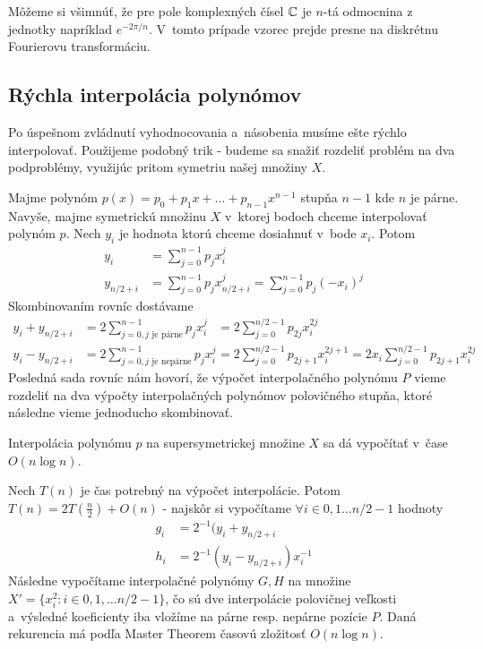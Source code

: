 \begin{poznamka}
    Môžeme si všimnúť, že pre pole komplexných čísel $\mathbb{C}$ je $n$-tá
    odmocnina z jednotky napríklad $e^{-2\pi/n}$. V~tomto prípade
    vzorec \todo{} prejde presne na diskrétnu Fourierovu
    transformáciu.
\end{poznamka}

\subsection{Rýchla interpolácia polynómov}
Po úspešnom zvládnutí vyhodnocovania a~násobenia musíme ešte rýchlo
interpolovať. Použijeme podobný trik - budeme sa snažiť rozdeliť
problém na dva podproblémy, využijúc pritom symetriu našej množiny $X$.

Majme polynóm $p(x)=p_0 + p_1 x + \dots + p_{n-1} x^{n-1}$ stupňa
$n-1$ kde $n$ je párne. Navyše, majme symetrickú množinu $X$ v~ktorej
bodoch chceme interpolovať polynóm $p$. 
Nech $y_i$ je hodnota ktorú chceme dosiahnuť v~bode $x_i$. Potom
\begin{align*}
    y_i &= \sum_{j=0}^{n-1} p_j x_i^j \\
    y_{n/2+i} &= \sum_{j=0}^{n-1} p_j x_{n/2+i}^j 
            = \sum_{j=0}^{n-1} p_j (-x_i)^j 
\end{align*}
Skombinovaním rovníc dostávame
\begin{align*}
    y_i + y_{n/2 + i} &= 2 \sum_{j=0, j\text{ je párne}}^{n-1} p_j x_i^j
     &= 2 \sum_{j=0}^{n/2-1} p_{2j} x_i^{2j} \\
    y_i - y_{n/2 + i} &= 2 \sum_{j=0, j\text{ je nepárne}}^{n-1} p_j x_i^j
     &= 2 \sum_{j=0}^{n/2-1} p_{2j+1} x_i^{2j+1} =
      2 x_i \sum_{j=0}^{n/2-1} p_{2j+1} x_i^{2j}
\end{align*}
Posledná sada rovníc nám hovorí, že výpočet interpolačného polynómu
$P$ vieme rozdeliť na dva výpočty interpolačných polynómov polovičného
stupňa, ktoré následne vieme jednoducho skombinovať.
\begin{lema}
    Interpolácia polynómu $p$ na supersymetrickej množine $X$ sa dá
    vypočítať v~čase $O(n \log n)$.
\end{lema}
\begin{dokaz}
    Nech $T(n)$ je čas potrebný na výpočet interpolácie.
    Potom $T(n)=2 T(\frac{n}{2}) + O(n)$ - najskôr si vypočítame
    $\forall i \in 0,1\dots n/2-1$ hodnoty 
    \begin{align}
        \label{eq:interpolacia_g}
        g_i &= 2^{-1}(y_i + y_{n/2+i} \\
        \label{eq:interpolacia_h}
        h_i &= 2^{-1}(y_i - y_{n/2+i}) x_i^{-1}
    \end{align}
    Následne
    vypočítame interpolačné polynómy $G,H$ na množine
    $X'=\{x_i^2 : i \in 0,1,\dots n/2-1\}$, čo sú dve interpolácie
    polovičnej veľkosti a~výsledné koeficienty iba vložíme na párne
    resp. nepárne pozície $P$.
    Daná rekurencia má podľa Master Theorem časovú zložitosť $O(n \log
    n)$.
\end{dokaz}

